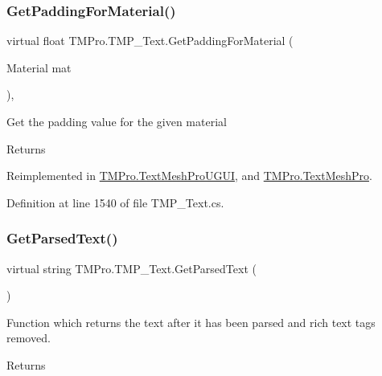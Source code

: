 \subsubsection{\texorpdfstring{GetPaddingForMaterial()}{GetPaddingForMaterial()}\hspace{0.1cm}{\footnotesize\ttfamily [2/2]}}
{\footnotesize\ttfamily virtual float T\+M\+Pro.\+T\+M\+P\+\_\+\+Text.\+Get\+Padding\+For\+Material (\begin{DoxyParamCaption}\item[{Material}]{mat }\end{DoxyParamCaption})\hspace{0.3cm}{\ttfamily [protected]}, {\ttfamily [virtual]}}



Get the padding value for the given material 

\begin{DoxyReturn}{Returns}

\end{DoxyReturn}


Reimplemented in \mbox{\hyperlink{class_t_m_pro_1_1_text_mesh_pro_u_g_u_i_a69bc3c5189896bbde641deefb4b76592}{T\+M\+Pro.\+Text\+Mesh\+Pro\+U\+G\+UI}}, and \mbox{\hyperlink{class_t_m_pro_1_1_text_mesh_pro_ad427fd2cbd79c9304efac4b9a496a234}{T\+M\+Pro.\+Text\+Mesh\+Pro}}.



Definition at line 1540 of file T\+M\+P\+\_\+\+Text.\+cs.

\mbox{\label{class_t_m_pro_1_1_t_m_p___text_a0cdf3acfceafe3443a2851dea9db0bb8}} 
\subsubsection{\texorpdfstring{GetParsedText()}{GetParsedText()}}
{\footnotesize\ttfamily virtual string T\+M\+Pro.\+T\+M\+P\+\_\+\+Text.\+Get\+Parsed\+Text (\begin{DoxyParamCaption}{ }\end{DoxyParamCaption})\hspace{0.3cm}{\ttfamily [virtual]}}



Function which returns the text after it has been parsed and rich text tags removed. 

\begin{DoxyReturn}{Returns}

\end{DoxyReturn}


